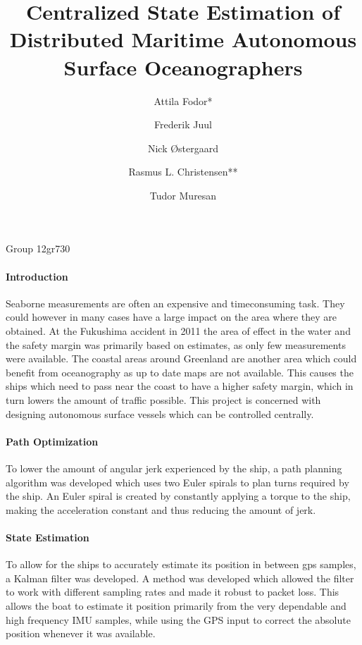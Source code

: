 \documentclass[a4paper,12pt]{memoir}
\begin{document}
\title{Centralized State Estimation of Distributed Maritime Autonomous Surface Oceanographers}
\author{Attila Fodor* \and Frederik Juul \and Nick \O stergaard \and Rasmus L. Christensen** \and Tudor Muresan}
\maketitle
\begin{center}
\vspace{-0.7cm}
Group 12gr730
\end{center}
\thispagestyle{empty}
\paragraph{Introduction}
Seaborne measurements are often an expensive and timeconsuming task. They could however in many cases have a large impact on the area where they are obtained. At the Fukushima accident in 2011 the area of effect in the water and the safety margin was primarily based on estimates, as only few measurements were available. The coastal areas around Greenland are another area which could benefit from oceanography as up to date maps are not available. This causes the ships which need to pass near the coast to have a higher safety margin, which in turn lowers the amount of traffic possible. This project is concerned with designing autonomous surface vessels which can be controlled centrally. 

\paragraph{Path Optimization}
To lower the amount of angular jerk experienced by the ship, a path planning algorithm was developed which uses two Euler spirals to plan turns required by the ship. An Euler spiral is created by constantly applying a torque to the ship, making the acceleration constant and thus reducing the amount of jerk. 

\paragraph{State Estimation}
To allow for the ships to accurately estimate its position in between gps samples, a Kalman filter was developed. A method was developed which allowed the filter to work with different sampling rates and made it robust to packet loss. This allows the boat to estimate it position primarily from the very dependable and high frequency IMU samples, while using the GPS input to correct the absolute position whenever it was available.
\end{document}
